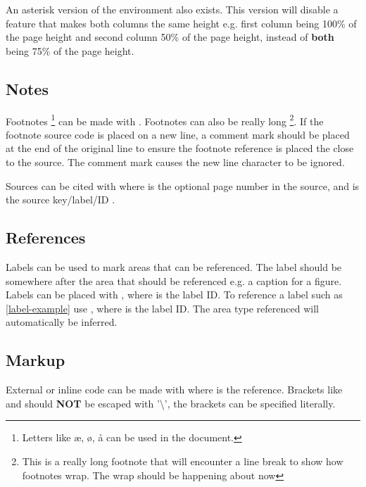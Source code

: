An asterisk version of the environment also exists.
This version will disable a feature that makes both columns the same height
e.g. first column being 100\% of the page height and second column 50\% of the page height,
instead of \textbf{both} being 75\% of the page height.

\begin{multicols}{2}
    \lipsum[2]
\end{multicols}


\subsection{Notes}
Footnotes%
\footnote{Letters like æ, ø, å can be used in the document. }
can be made with .
Footnotes can also be really long%
\footnote{This is a really long footnote that will encounter a line break to show how footnotes wrap. The wrap should be happening about now}.
If the footnote source code is placed on a new line,
a comment mark \rawref{\%} should be placed at the end of the original line
to ensure the footnote reference is placed the close to the source.
The comment mark causes the new line character to be ignored.

\label{label-example} %

Sources %
can be cited with
where  is the optional page number in the source,
and  is the source key/label/ID%
.


\subsection{References}
Labels can be used to mark areas that can be referenced.
The label should be somewhere after the area that should be referenced e.g. a caption for a figure.
Labels can be placed with ,
where  is the label ID.
To reference a label such as \cref{label-example} use ,
where  is the label ID.
The area type referenced will automatically be inferred.


\subsection{Markup}
External or inline code  can be made with 
 where  is the reference. 
Brackets like \rawref{[} and \rawref{]} should \textbf{NOT} be escaped with '\textbackslash',
the brackets can be specified literally.

